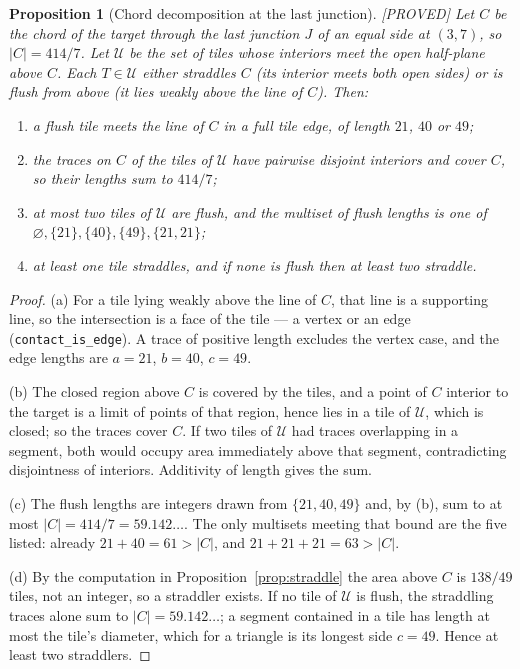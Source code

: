 \documentclass[11pt,reqno]{amsart}
\theoremstyle{plain}
\newtheorem{proposition}[theorem]{Proposition}
\theoremstyle{definition}
\newcommand{\lab}[1]{\hfill\textnormal{\footnotesize\textsc{[#1]}}}
\begin{document}
\begin{proposition}[Chord decomposition at the last junction]\label{prop:chorddecomp}\lab{PROVED}
Let $C$ be the chord of the target through the last junction $J$ of an equal side at $(3,7)$, so
$|C|=414/7$. Let $\mathcal U$ be the set of tiles whose interiors meet the open half-plane above $C$.
Each $T\in\mathcal U$ either \emph{straddles} $C$ (its interior meets both open sides) or is
\emph{flush from above} (it lies weakly above the line of $C$). Then:
\begin{enumerate}
\item[(a)] a flush tile meets the line of $C$ in a full tile edge, of length $21$, $40$ or $49$;
\item[(b)] the traces on $C$ of the tiles of $\mathcal U$ have pairwise disjoint interiors and cover
$C$, so their lengths sum to $414/7$;
\item[(c)] at most two tiles of $\mathcal U$ are flush, and the multiset of flush lengths is one of
$\varnothing,\{21\},\{40\},\{49\},\{21,21\}$;
\item[(d)] at least one tile straddles, and if none is flush then at least two straddle.
\end{enumerate}
\end{proposition}

\begin{proof}
(a) For a tile lying weakly above the line of $C$, that line is a supporting line, so the intersection
is a face of the tile --- a vertex or an edge (\texttt{contact\_is\_edge}). A trace of positive length
excludes the vertex case, and the edge lengths are $a=21$, $b=40$, $c=49$.

(b) The closed region above $C$ is covered by the tiles, and a point of $C$ interior to the target is
a limit of points of that region, hence lies in a tile of $\mathcal U$, which is closed; so the traces
cover $C$. If two tiles of $\mathcal U$ had traces overlapping in a segment, both would occupy area
immediately above that segment, contradicting disjointness of interiors. Additivity of length gives
the sum.

(c) The flush lengths are integers drawn from $\{21,40,49\}$ and, by (b), sum to at most
$|C|=414/7=59.142\ldots$. The only multisets meeting that bound are the five listed: already
$21+40=61>|C|$, and $21+21+21=63>|C|$.

(d) By the computation in Proposition~\ref{prop:straddle} the area above $C$ is $138/49$ tiles, not an
integer, so a straddler exists. If no tile of $\mathcal U$ is flush, the straddling traces alone sum to
$|C|=59.142\ldots$; a segment contained in a tile has length at most the tile's diameter, which for a
triangle is its longest side $c=49$. Hence at least two straddlers.
\end{proof}
\end{document}
